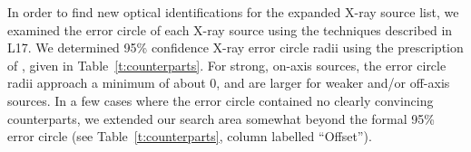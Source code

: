 \documentclass[fleqn,usenatbib]{mnras}
\newcommand{\hst}{\emph{HST}}
\begin{document}
\begin{table}
    \caption{\hst\ observations used in this work.}
    \label{t:hst_obs}
    \centering
\end{table}

In order to find new optical identifications for the expanded X-ray source list, we examined the error circle of each X-ray source using the techniques described in L17. %
We determined 95\% confidence X-ray error circle radii using the prescription of \citet{Hong05}, %
given in Table~\ref{t:counterparts}. For strong, on-axis sources, the error circle radii approach a minimum of about 0, and are larger for weaker and/or off-axis sources. In a few cases where the error circle contained no clearly convincing counterparts, we extended our search area somewhat beyond the formal 95\% error circle (see Table~\ref{t:counterparts}, column labelled ``Offset'').
\end{document}
